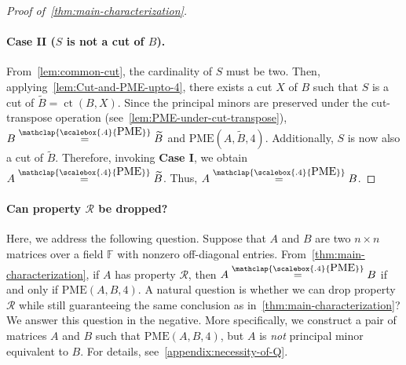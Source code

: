 \documentclass[11pt,letterpaper]{article}
\DeclareMathOperator*{\tw}{ct}
\newcommand{\F}{\mathbb{F}}
\newcommand{\PME}{\stackrel{\mathclap{\scalebox{.4}{\mbox{PME}}}}{=}}
\newcommand{\nPME}{\stackrel{\mathclap{\scalebox{.4}{\mbox{PME}}}}{\neq}}
\newcommand{\kPME}[3]{\mathrm{PME}(#1, #2, #3)}
\newcommand{\prop}{\mathcal{R}}
\begin{document}
{{{\begin{proof}[Proof of~\cref{thm:main-characterization}]
\paragraph*{Case II ($S$ is not a cut of $B$).} From~\cref{lem:common-cut}, the cardinality of $S$ must be two. Then, applying~\cref{lem:Cut-and-PME-upto-4}, there exists a cut $X$ of $B$ such that $S$ is a cut of $\widetilde B=\tw(B, X)$. Since the principal minors are preserved under the cut-transpose operation (see~\cref{lem:PME-under-cut-transpose}), $B\PME \widetilde B$ and $\kPME{A}{\widetilde B}{4}$. Additionally, $S$ is now also a cut of $\widetilde B$. Therefore, invoking \textbf{Case I}, we obtain $A\PME \widetilde B$. Thus, $A\PME B$. 
\end{proof}

\paragraph{Can property  $\prop$ be dropped?}
Here, we address the following question. Suppose that $A$ and $B$ are two $n\times n$ matrices over a field $\F$ with nonzero off-diagonal entries. From~\cref{thm:main-characterization}, if $A$ has property $\prop$, then $A\PME B$ if and only if $\kPME{A}{B}{4}$. A natural question is whether we can drop property $\prop$ while still guaranteeing the same conclusion as in~\cref{thm:main-characterization}? We answer this question in the negative. More specifically, we construct a pair of matrices $A$ and $B$ such that $\kPME{A}{B}{4}$, but $A$ is \emph{not} principal minor equivalent to $B$. For details, see~\cref{appendix:necessity-of-Q}.    








}}}
\end{document}
